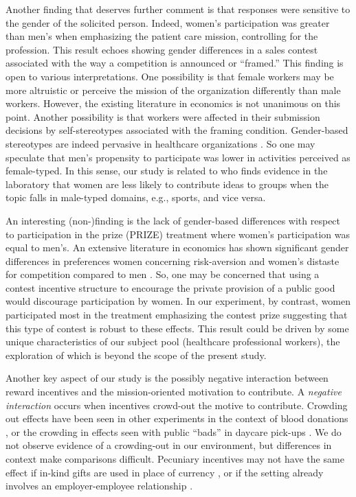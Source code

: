 \documentclass[11pt, titlepage]{article}
\begin{document}
Another finding that deserves further comment is that responses were
sensitive to the gender of the solicited person. Indeed, women's
participation was greater than men's when emphasizing the patient care
mission, controlling for the profession. This result echoes
\citet{delfgaauw2013tournament} showing gender differences in a sales
contest associated with the way a competition is announced or
``framed.'' This finding is open to various interpretations. One
possibility is that female workers may be more altruistic or perceive
the mission of the organization differently than male workers. However,
the existing literature in economics \citep{croson2009gender} is not
unanimous on this point. Another possibility is that workers were
affected in their submission decisions by self-stereotypes associated
with the framing condition. Gender-based stereotypes are indeed
pervasive in healthcare organizations \citep{evans2002cautious}. So one
may speculate that men's propensity to participate was lower in
activities perceived as female-typed. In this sense, our study is
related to \citet{coffman2014evidence} who finds evidence in the
laboratory that women are less likely to contribute ideas to groups when
the topic falls in male-typed domains, e.g., sports, and vice versa.

An interesting (non-)finding is the lack of gender-based differences
with respect to participation in the prize (PRIZE) treatment where
women's participation was equal to men's. An extensive literature in
economics has shown significant gender differences in preferences women
concerning risk-aversion \citep{borghans2009gender} and women's distaste
for competition compared to men \citep{niederle2007women}. So, one may
be concerned that using a contest incentive structure to encourage the
private provision of a public good would discourage participation by
women. In our experiment, by contrast, women participated most in the
treatment emphasizing the contest prize suggesting that this type of
contest is robust to these effects. This result could be driven by some
unique characteristics of our subject pool (healthcare professional
workers), the exploration of which is beyond the scope of the present
study.

Another key aspect of our study is the possibly negative interaction
between reward incentives and the mission-oriented motivation to
contribute. A \emph{negative interaction} occurs when incentives
crowd-out the motive to contribute. Crowding out effects have been seen
in other experiments in the context of blood donations
\citep{lacetera2013economic, lacetera2014rewarding}, or the crowding in
effects seen with public ``bads'' in daycare pick-ups
\citep{gneezy2000fine}. We do not observe evidence of a crowding-out in
our environment, but differences in context make comparisons difficult.
Pecuniary incentives may not have the same effect if in-kind gifts are
used in place of currency \citep[e.g.,][]{kube2012currency}, or if the
setting already involves an employer-employee relationship
\citep[e.g.,][]{fehr1998gift}.
\end{document}
